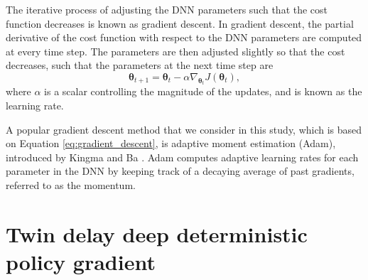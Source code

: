 The iterative process of adjusting the DNN parameters such that the cost function decreases is known as gradient descent.
In gradient descent,  the partial derivative of the cost function with respect to the DNN parameters are computed at every time step. 
The parameters are then adjusted slightly so that the cost decreases, such that the parameters at the next time step are
\begin{equation}
    \bm{\theta}_{t+1} = \bm{\theta}_{t} - \alpha \nabla_{\bm{\theta}_t}J(\bm{\theta}_t),
    \label{eq:gradient_descent}
\end{equation}
where $\alpha$ is a scalar controlling the magnitude of the updates, and is known as the learning rate.

A popular gradient descent method that we consider in this study, which is based on Equation \ref{eq:gradient_descent}, is adaptive moment estimation (Adam), introduced by Kingma and Ba \cite{kingma2015}. 
Adam computes adaptive learning rates for each parameter in the DNN by keeping track of a decaying average of past gradients, referred to as the momentum. 













\section{Twin delay deep deterministic policy gradient}\label{sec:td3}

